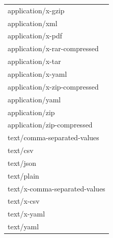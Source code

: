 \begin{toappendix}
{\begin{tabular}{l}
			application/x-gzip                                                        \\
			application/xml                                                           \\
			application/x-pdf                                                         \\
			application/x-rar-compressed                                              \\
			application/x-tar                                                         \\
			application/x-yaml                                                        \\
			application/x-zip-compressed                                              \\
			application/yaml                                                          \\
			application/zip                                                           \\
			application/zip-compressed                                                \\
			text/comma-separated-values                                               \\
			text/csv                                                                  \\
			text/json                                                                 \\
			text/plain                                                                \\
			text/x-comma-separated-values                                             \\
			text/x-csv                                                                \\
			text/x-yaml                                                               \\
			text/yaml                                                                 \\
		\end{tabular}}
	\clearpage
\end{toappendix}
